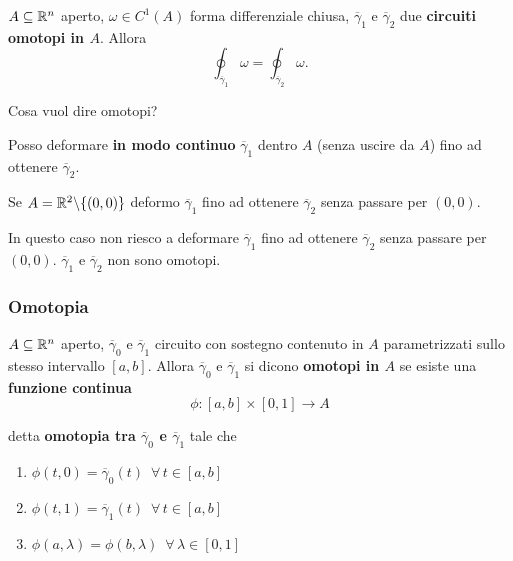 \begin{theorem}
	$A \subseteq \mathbb{R}^n$ aperto, $\omega \in C^1(A)$ forma differenziale chiusa, $\overline{\gamma}_1$ e $\overline{\gamma}_2$ due \textbf{circuiti omotopi in $A$}. Allora
	\begin{equation*}
		\oint_{\overline{\gamma}_1}\omega=\oint_{\overline{\gamma}_2}\omega.
	\end{equation*}
	
	Cosa vuol dire omotopi?
	
	Posso deformare \textbf{in modo continuo} $\overline{\gamma}_1$ dentro $A$ (senza uscire da $A$) fino ad ottenere $\overline{\gamma}_2$.
	
	
	Se $A=\mathbb{R}^2\backslash\{(0,0)\}$ deformo $\overline{\gamma}_1$ fino ad ottenere $\overline{\gamma}_2$ senza passare per $(0,0)$.
	
	
	In questo caso non riesco a deformare $\overline{\gamma}_1$ fino ad ottenere $\overline{\gamma}_2$ senza passare per $(0,0)$. $\overline{\gamma}_1$ e $\overline{\gamma}_2$ non sono omotopi. 	
\end{theorem}


\subsubsection{Omotopia}
\begin{definition}
	$A \subseteq \mathbb{R}^n$ aperto, $\overline{\gamma}_0$ e $\overline{\gamma}_1$ circuito con sostegno contenuto in $A$ parametrizzati sullo stesso intervallo $[a,b]$. Allora $\overline{\gamma}_0$ e $\overline{\gamma}_1$ si dicono \textbf{omotopi in $A$} se esiste una \textbf{funzione continua}
	\begin{equation*}
		\phi: [a,b]\times [0,1]\rightarrow A
	\end{equation*}
	
	detta \textbf{omotopia tra $\overline{\gamma}_0$ e $\overline{\gamma}_1$} tale che
	\begin{enumerate}
		\item $\phi(t,0)=\overline{\gamma}_0(t)\,\,\, \forall\, t \in [a,b]$
		\item $\phi(t,1)=\overline{\gamma}_1(t)\,\,\, \forall\, t \in [a,b]$
		\item $\phi(a,\lambda)=\phi(b,\lambda)\,\,\, \forall \, \lambda \in[0,1]$
	\end{enumerate}
\end{definition}
	

